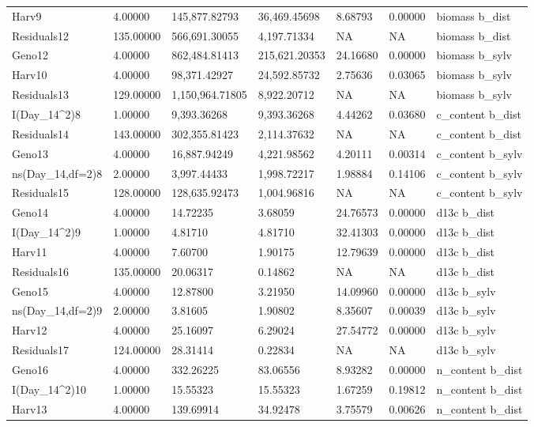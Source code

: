 \documentclass[jou,floatsintext]{apa6}
\begin{document}
\begin{table}[tbp]
\begin{center}
\begin{threeparttable}
{\begin{tabular}{lllllll}
Harv9 & 4.00000 & 145,877.82793 & 36,469.45698 & 8.68793 & 0.00000 & biomass b\_dist\\
Residuals12 & 135.00000 & 566,691.30055 & 4,197.71334 & NA & NA & biomass b\_dist\\
Geno12 & 4.00000 & 862,484.81413 & 215,621.20353 & 24.16680 & 0.00000 & biomass b\_sylv\\
Harv10 & 4.00000 & 98,371.42927 & 24,592.85732 & 2.75636 & 0.03065 & biomass b\_sylv\\
Residuals13 & 129.00000 & 1,150,964.71805 & 8,922.20712 & NA & NA & biomass b\_sylv\\
I(Day\_14\textasciicircum{}2)8 & 1.00000 & 9,393.36268 & 9,393.36268 & 4.44262 & 0.03680 & c\_content b\_dist\\
Residuals14 & 143.00000 & 302,355.81423 & 2,114.37632 & NA & NA & c\_content b\_dist\\
Geno13 & 4.00000 & 16,887.94249 & 4,221.98562 & 4.20111 & 0.00314 & c\_content b\_sylv\\
ns(Day\_14,df=2)8 & 2.00000 & 3,997.44433 & 1,998.72217 & 1.98884 & 0.14106 & c\_content b\_sylv\\
Residuals15 & 128.00000 & 128,635.92473 & 1,004.96816 & NA & NA & c\_content b\_sylv\\
Geno14 & 4.00000 & 14.72235 & 3.68059 & 24.76573 & 0.00000 & d13c b\_dist\\
I(Day\_14\textasciicircum{}2)9 & 1.00000 & 4.81710 & 4.81710 & 32.41303 & 0.00000 & d13c b\_dist\\
Harv11 & 4.00000 & 7.60700 & 1.90175 & 12.79639 & 0.00000 & d13c b\_dist\\
Residuals16 & 135.00000 & 20.06317 & 0.14862 & NA & NA & d13c b\_dist\\
Geno15 & 4.00000 & 12.87800 & 3.21950 & 14.09960 & 0.00000 & d13c b\_sylv\\
ns(Day\_14,df=2)9 & 2.00000 & 3.81605 & 1.90802 & 8.35607 & 0.00039 & d13c b\_sylv\\
Harv12 & 4.00000 & 25.16097 & 6.29024 & 27.54772 & 0.00000 & d13c b\_sylv\\
Residuals17 & 124.00000 & 28.31414 & 0.22834 & NA & NA & d13c b\_sylv\\
Geno16 & 4.00000 & 332.26225 & 83.06556 & 8.93282 & 0.00000 & n\_content b\_dist\\
I(Day\_14\textasciicircum{}2)10 & 1.00000 & 15.55323 & 15.55323 & 1.67259 & 0.19812 & n\_content b\_dist\\
Harv13 & 4.00000 & 139.69914 & 34.92478 & 3.75579 & 0.00626 & n\_content b\_dist\\

\end{tabular}}
\end{threeparttable}
\end{center}
\end{table}
\end{document}
